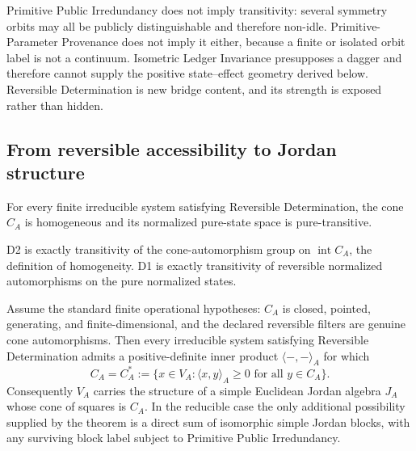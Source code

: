 \begin{remark}
Primitive Public Irredundancy does not imply transitivity: several symmetry orbits
may all be publicly distinguishable and therefore non-idle.  Primitive-Parameter
Provenance does not imply it either, because a finite or isolated orbit label is not
a continuum.  Isometric Ledger Invariance presupposes a dagger and therefore cannot
supply the positive state--effect geometry derived below.  Reversible Determination
is new bridge content, and its strength is exposed rather than hidden.
\end{remark}

\subsection{From reversible accessibility to Jordan structure}

\begin{theorem}
\label{thm:rd-homogeneous-pure-transitive}
For every finite irreducible system satisfying Reversible Determination, the cone
$C_A$ is homogeneous and its normalized pure-state space is pure-transitive.
\end{theorem}

\begin{proofsketch}
D2 is exactly transitivity of the cone-automorphism group on
$\operatorname{int}C_A$, the definition of homogeneity.  D1 is exactly transitivity
of reversible normalized automorphisms on the pure normalized states.
\end{proofsketch}

\begin{theorem}
\label{thm:rd-jordan-closure}
Assume the standard finite operational hypotheses: $C_A$ is closed, pointed,
generating, and finite-dimensional, and the declared reversible filters are genuine
cone automorphisms.  Then every irreducible system satisfying Reversible
Determination admits a positive-definite inner product $\langle-,-\rangle_A$ for
which
\[
 C_A
 =
 C_A^*
 :=
 \{x\in V_A:\langle x,y\rangle_A\ge0\text{ for all }y\in C_A\}.
\]
Consequently $V_A$ carries the structure of a simple Euclidean Jordan algebra
$J_A$ whose cone of squares is $C_A$.  In the reducible case the only additional
possibility supplied by the theorem is a direct sum of isomorphic simple Jordan
blocks, with any surviving block label subject to Primitive Public Irredundancy.
\end{theorem}

